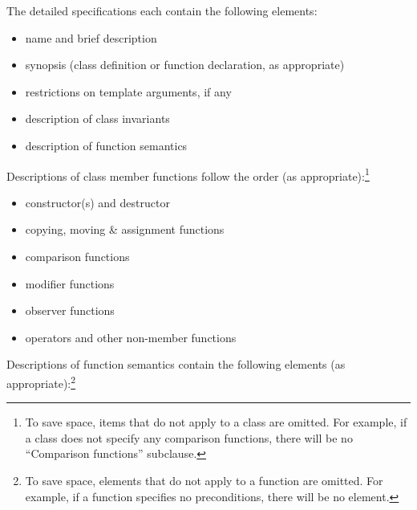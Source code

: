 \pnum
The detailed specifications each contain the following elements:%

\begin{itemize}
\item name and brief description
\item synopsis (class definition or function declaration, as appropriate)
\item restrictions on template arguments, if any
\item description of class invariants
\item description of function semantics
\end{itemize}

\pnum
Descriptions of class member functions follow the order (as
appropriate):\footnote{To save space, items that do not apply to a class are omitted.
For example, if a class does not specify any comparison functions, there
will be no ``Comparison functions'' subclause.}

\begin{itemize}
\item constructor(s) and destructor
\item copying, moving \& assignment functions
\item comparison functions
\item modifier functions
\item observer functions
\item operators and other non-member functions
\end{itemize}

\pnum
Descriptions of function semantics contain the following elements (as
appropriate):\footnote{To save space, elements that do not apply to a function are omitted.
For example, if a function specifies no
preconditions, there will be no \expects element.}

